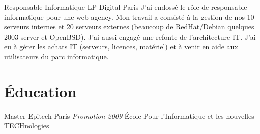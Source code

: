 \documentclass[11pt,a4paper,sans]{moderncv}
\begin{document}
{Responsable Informatique}
{LP Digital}
{Paris}
{}
{J'ai endoss\'e le r\^ole de responsable informatique pour une web agency.\newline{}
Mon travail a consist\'e \`a la gestion de nos 10 serveurs internes et 20 serveurs
externes (beaucoup de RedHat/Debian quelques 2003 server et OpenBSD). J'ai aussi
engag\'e une refonte de l'architecture IT.
J'ai eu \`a g\'erer les achats IT (serveurs, licences, mat\'eriel) et \`a venir en aide
aux utilisateurs du parc informatique.
}
\pagebreak
\section{\'Education}

{Master}
{Epitech}
{Paris}
{\textit{Promotion 2009}}
{\'Ecole Pour l'Informatique et les nouvelles TECHnologies}
\end{document}
